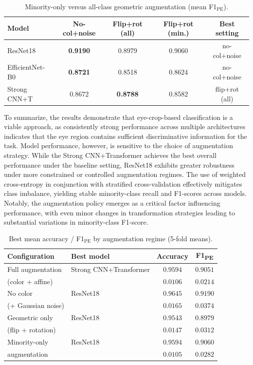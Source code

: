 \documentclass[preprint,12pt,authoryear]{elsarticle}
\begin{document}
\begin{table}
\scriptsize
  \caption{Minority-only versus all-class geometric augmentation
    (mean F1$_{\mathrm{PE}}$).}
  \label{tab:ablation_minority}
  \centering
  \setlength{\tabcolsep}{4pt}
  \begin{tabular}{lcccc}
    \toprule
    \textbf{Model}
      & \textbf{No-col+noise}
      & \textbf{Flip+rot (all)}
      & \textbf{Flip+rot (min.)}
      & \textbf{Best setting} \\
    \midrule
    ResNet18
      & \textbf{0.9190} & 0.8979 & 0.9060 & no-col+noise \\
    EfficientNet-B0
      & \textbf{0.8721} & 0.8518 & 0.8624 & no-col+noise \\
    Strong CNN+T
      & 0.8672 & \textbf{0.8788} & 0.8582 & flip+rot (all) \\
    \bottomrule
  \end{tabular}
\end{table}


To summarize, the results demonstrate that eye-crop-based classification is a viable approach, as consistently strong performance across multiple architectures indicates that the eye region contains sufficient discriminative information for the task. Model performance, however, is sensitive to the choice of augmentation strategy. While the Strong CNN+Transformer achieves the best overall performance under the baseline setting, ResNet18 exhibits greater robustness under more constrained or controlled augmentation regimes. The use of weighted cross-entropy in conjunction with stratified cross-validation effectively mitigates class imbalance, yielding stable minority-class recall and F1-scores across models. Notably, the augmentation policy emerges as a critical factor influencing performance, with even minor changes in transformation strategies leading to substantial variations in minority-class F1-score.

\begin{table}
  \caption{Best mean accuracy / F1$_{\mathrm{PE}}$ by augmentation
    regime (5-fold means).}
  \label{tab:full_comparison}
  \centering
  \begin{tabular}{llcc}
    \toprule
    \textbf{Configuration}
      & \textbf{Best model}
      & \textbf{Accuracy}
      & \textbf{F1\textsubscript{PE}} \\
    \midrule
    Full augmentation  & Strong CNN+Transformer & $0.9594$ & $0.9051$ \\
    (color + affine)  &  & $0.0106$ & $0.0214$ \\
\hline
No color & ResNet18 & $0.9645$  & $0.9190$ \\
(+ Gaussian noise) &  & $0.0165$ & $0.0374$ \\
\hline
Geometric only & ResNet18 & $0.9543$ & $0.8979$ \\
(flip + rotation) & & $0.0147$ & $0.0312$ \\
\hline
Minority-only & ResNet18 & $0.9594$ & $0.9060$ \\
augmentation &  & $0.0105$ & $0.0282$ \\
    \bottomrule
  \end{tabular}
\end{table}
\end{document}
